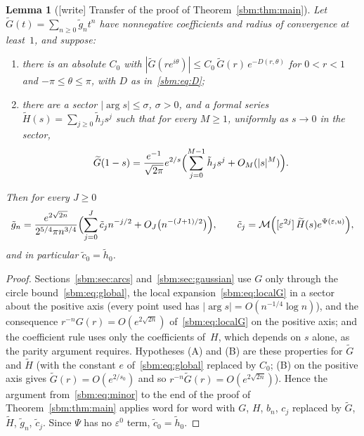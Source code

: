 \documentclass[11pt,letterpaper]{article}
\numberwithin{equation}{section}
\newtheorem{lemma}[theorem]{Lemma}
\theoremstyle{remark}\newtheorem{remark}[theorem]{Remark}
\begin{document}
\begin{lemma}[{[write]} Transfer of the proof of Theorem~\ref{sbm:thm:main}]\label{sbm:lem:transfer}
Let $\widetilde G(t)=\sum_{n\ge0}\tilde g_nt^n$ have nonnegative coefficients
and radius of convergence at least~$1$, and suppose:
\begin{enumerate}
\item[(A)] there is an absolute $C_0$ with
 $|\widetilde G(re^{i\theta})|\le C_0\,\widetilde G(r)\,e^{-D(r,\theta)}$
 for $0<r<1$ and $-\pi\le\theta\le\pi$, with $D$ as in~\eqref{sbm:eq:D};
\item[(B)] there are a sector $|\arg s|\le\sigma$, $\sigma>0$, and a formal
 series $\widetilde H(s)=\sum_{j\ge0}\tilde h_js^j$ such that for every
 $M\ge1$, uniformly as $s\to0$ in the sector,
 \[
  \widetilde G(1-s)=\frac{e^{-1}}{\sqrt{2\pi}}e^{2/s}
  \Bigl(\sum_{j=0}^{M-1}\tilde h_js^j+O_M(|s|^M)\Bigr).
 \]
\end{enumerate}
Then for every $J\ge0$
\[
 \tilde g_n=\frac{e^{2\sqrt{2n}}}{2^{5/4}\pi n^{3/4}}
 \Bigl(\sum_{j=0}^J\tilde c_jn^{-j/2}+O_J\bigl(n^{-(J+1)/2}\bigr)\Bigr),
 \qquad
 \tilde c_j=\mathcal M\Bigl([\varepsilon^{2j}]\,\widetilde H(s)e^{\Psi(\varepsilon,u)}\Bigr),
\]
and in particular $\tilde c_0=\tilde h_0$.
\end{lemma}
\begin{proof}
Sections~\ref{sbm:sec:arcs} and~\ref{sbm:sec:gaussian} use $G$ only through
the circle bound~\eqref{sbm:eq:global}, the local
expansion~\eqref{sbm:eq:localG} in a sector about the positive axis (every
point used has $|\arg s|=O(n^{-1/4}\log n)$), and the consequence
$r^{-n}G(r)=O(e^{2\sqrt{2n}})$ of~\eqref{sbm:eq:localG} on the positive axis;
and the coefficient rule uses only the coefficients of~$H$, which depends on
$s$ alone, as the parity argument requires. Hypotheses (A) and (B) are these
properties for $\widetilde G$ and $\widetilde H$ (with the constant $e$
of~\eqref{sbm:eq:global} replaced by $C_0$; (B) on the positive axis gives
$\widetilde G(r)=O(e^{2/s_0})$ and so $r^{-n}\widetilde G(r)=O(e^{2\sqrt{2n}})$).
Hence the argument from~\eqref{sbm:eq:minor} to the end of the proof of
Theorem~\ref{sbm:thm:main} applies word for word with $G$, $H$, $b_n$, $c_j$
replaced by $\widetilde G$, $\widetilde H$, $\tilde g_n$, $\tilde c_j$.
Since $\Psi$ has no $\varepsilon^0$ term, $\tilde c_0=\tilde h_0$.
\end{proof}
\end{document}
